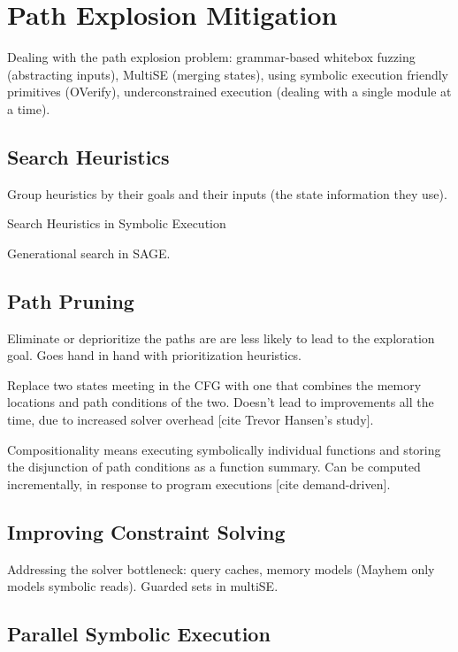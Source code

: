 
\section{Path Explosion Mitigation}

Dealing with the path explosion problem: grammar-based whitebox fuzzing (abstracting inputs), MultiSE (merging states), using symbolic execution friendly primitives (OVerify), underconstrained execution (dealing with a single module at a time).

\subsection{Search Heuristics}

Group heuristics by their goals and their inputs (the state information they use).

Search Heuristics in Symbolic Execution

Generational search in SAGE.

\subsection{Path Pruning}

Eliminate or deprioritize the paths are are less likely to lead to the exploration goal.  Goes hand in hand with prioritization heuristics.

Replace two states meeting in the CFG with one that combines the memory locations and path conditions of the two.  Doesn't lead to improvements all the time, due to increased solver overhead [cite Trevor Hansen's study].

Compositionality means executing symbolically individual functions and storing the disjunction of path conditions as a function summary.  Can be computed incrementally, in response to program executions [cite demand-driven].

\subsection{Improving Constraint Solving}

Addressing the solver bottleneck: query caches, memory models (Mayhem only models symbolic reads). Guarded sets in multiSE.

\subsection{Parallel Symbolic Execution}

